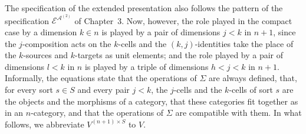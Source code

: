\documentclass{amsart}
\theoremstyle{plain}
\theoremstyle{definition}
\begin{document}
The specification of the extended presentation also follows the pattern of the specification $\boldsymbol{\mathcal{E}}^{\boldsymbol{\mathcal{A}}^{(2)}}$ of Chapter~3. Now, however, the role played in the compact case by a dimension $k\in n$ is played by a pair of dimensions $j<k$ in $n+1$, since the $j$-composition acts on the $k$-cells and the $(k,j)$-identities take the place of the $k$-sources and $k$-targets as unit elements; and the role played by a pair of dimensions $l<k$ in $n$ is played by a triple of dimensions $h<j<k$ in $n+1$. Informally, the equations state that the operations of $\Sigma$ are always defined, that, for every sort $s\in S$ and every pair $j<k$, the $j$-cells and the $k$-cells of sort $s$ are the objects and the morphisms of a category, that these categories fit together as in an $n$-category, and that the operations of $\Sigma$ are compatible with them. In what follows, we abbreviate $V^{(n+1)\times S}$ to $V$.
\end{document}
